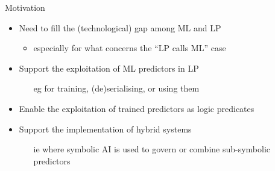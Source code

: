 \documentclass[presentation]{beamer}\mode<presentation>{\usetheme{AMSBolognaFC}}
\begin{document}
\begin{frame}[c]{Motivation}
    \begin{itemize}
        \item Need to fill the (technological) gap among ML and LP
        \begin{itemize}
            \item especially for what concerns the ``LP calls ML'' case
        \end{itemize}
        
        \vfill
        
        \item Support the exploitation of ML predictors in LP
        \begin{itemize}
            \item[eg] for training, (de)serialising, or using them 
        \end{itemize}
        
        \vfill
        
        \item Enable the exploitation of trained predictors as logic predicates
        
        \vfill
        
        \item Support the implementation of hybrid systems
         \begin{itemize}
            \item[ie] where symbolic AI is used to govern or combine sub-symbolic predictors
        \end{itemize}
        
    \end{itemize}
\end{frame}
\end{document}

